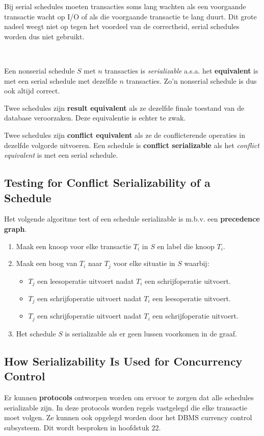Bij serial schedules moeten transacties soms lang wachten als een voorgaande transactie wacht op I/O of als die voorgaande transactie te lang duurt. Dit grote nadeel weegt niet op tegen het voordeel van de correctheid, serial schedules worden dus niet gebruikt.

~

\noindent Een nonserial schedule $S$ met $n$ transacties is \textit{serializable} a.s.a. het \textbf{equivalent} is met een serial schedule met dezelfde $n$ transacties. Zo'n nonserial schedule is dus ook altijd correct.

Twee schedules zijn \textbf{result equivalent} als ze dezelfde finale toestand van de database veroorzaken. Deze equivalentie is echter te zwak.

Twee schedules zijn \textbf{conflict equivalent} als ze de conflicterende operaties in dezelfde volgorde uitvoeren. Een schedule is \textbf{conflict serializable} als het \textit{conflict equivalent} is met een serial schedule.


\subsection{Testing for Conflict Serializability of a Schedule}
Het volgende algoritme test of een schedule serializable is m.b.v. een \textbf{precedence graph}.
\begin{enumerate}\addtolength{\itemsep}{-0.2\baselineskip}
	\item Maak een knoop voor elke transactie $T_i$ in $S$ en label die knoop $T_i$.
	\item Maak een boog van $T_i$ naar $T_j$ voor elke situatie in $S$ waarbij:
	\vspace{-2mm}
	\begin{itemize}
		\item $T_j$ een leesoperatie uitvoert nadat $T_i$ een schrijfoperatie uitvoert.
		\item $T_j$ een schrijfoperatie uitvoert nadat $T_i$ een leesoperatie uitvoert.
		\item $T_j$ een schrijfoperatie uitvoert nadat $T_i$ een schrijfoperatie uitvoert.
	\end{itemize}
	\item Het schedule $S$ is serializable als er geen lussen voorkomen in de graaf.
\end{enumerate}


\subsection{How Serializability Is Used for Concurrency Control}
Er kunnen \textbf{protocols} ontworpen worden om ervoor te zorgen dat alle schedules serializable zijn. In deze protocols worden regels vastgelegd die elke transactie moet volgen. Ze kunnen ook opgelegd worden door het DBMS currency control subsysteem. Dit wordt besproken in hoofdstuk 22.


